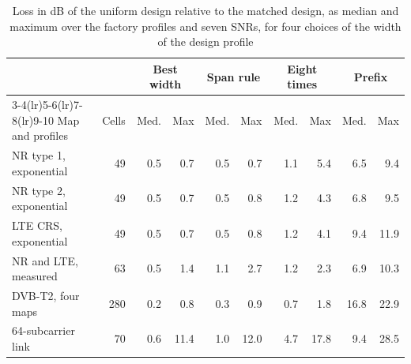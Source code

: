 \begin{table}[t]
\caption{Loss in dB of the uniform design relative to the matched design, as median and maximum over the factory profiles and seven SNRs, for four choices of the width of the design profile}
\label{tab:span}
\centering
\footnotesize
\setlength{\tabcolsep}{5pt}
\begin{tabular}{lr rr rr rr rr}
\toprule
 & & \multicolumn{2}{c}{Best width} & \multicolumn{2}{c}{Span rule} & \multicolumn{2}{c}{Eight times} & \multicolumn{2}{c}{Prefix} \\
\cmidrule(lr){3-4}\cmidrule(lr){5-6}\cmidrule(lr){7-8}\cmidrule(lr){9-10}
Map and profiles & Cells & Med. & Max & Med. & Max & Med. & Max & Med. & Max \\
\midrule
NR type 1, exponential & 49 & 0.5 & 0.7 & 0.5 & 0.7 & 1.1 & 5.4 & 6.5 & 9.4 \\
NR type 2, exponential & 49 & 0.5 & 0.7 & 0.5 & 0.8 & 1.2 & 4.3 & 6.8 & 9.5 \\
LTE CRS, exponential & 49 & 0.5 & 0.7 & 0.5 & 0.8 & 1.2 & 4.1 & 9.4 & 11.9 \\
NR and LTE, measured & 63 & 0.5 & 1.4 & 1.1 & 2.7 & 1.2 & 2.3 & 6.9 & 10.3 \\
DVB-T2, four maps & 280 & 0.2 & 0.8 & 0.3 & 0.9 & 0.7 & 1.8 & 16.8 & 22.9 \\
64-subcarrier link & 70 & 0.6 & 11.4 & 1.0 & 12.0 & 4.7 & 17.8 & 9.4 & 28.5 \\
\bottomrule
\end{tabular}
\end{table}
